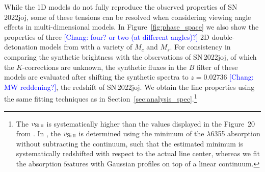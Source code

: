 \documentclass[twocolumn]{aastex631}
\newcommand{\sn}{SN\,2022joj}
\newcommand{\chang}[1]{\textcolor{blue}{[Chang: #1]}}
\begin{document}
\begin{CJK*}{UTF8}{gbsn}
While the 1D models do not fully reproduce the observed properties of \sn, some of these tensions can be resolved when considering viewing angle effects in multi-dimensional models. In Figure~\ref{fig:phase_space} we also show the properties of three \chang{four? or two (at different angles)?} 2D double-detonation models from \citet{Shen_2D_2021} with a variety of $M_c$ and $M_s$. For consistency in comparing the synthetic brightness with the observations of \sn, of which the $K$-corrections are unknown, the synthetic fluxes in the $B$ filter of these models are evaluated after shifting the synthetic spectra to $z=0.02736$ \chang{MW reddening?}, the redshift of \sn. We obtain the  line properties using the same fitting techniques as in Section~\ref{sec:analysis_spec}.\footnote{The $v_\mathrm{Si\,\textsc{ii}}$ is systematically higher than the values displayed in the Figure~20 from \citet{Shen_2D_2021}. In \citet{Shen_2D_2021}, the $v_\mathrm{Si\,\textsc{ii}}$ is determined using the minimum of the  $\lambda$6355 absorption without subtracting the continuum, such that the estimated minimum is systematically redshifted with respect to the actual line center, whereas we fit the absorption features with Gaussian profiles on top of a linear continuum.}  

\end{CJK*}
\end{document}
